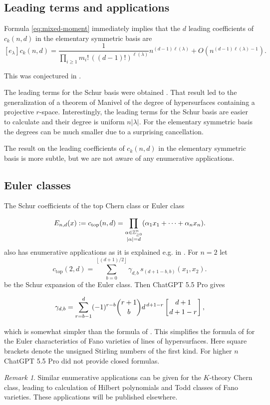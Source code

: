 \documentclass[11pt]{amsart}
\numberwithin{equation}{section}
\theoremstyle{remark}
\newtheorem{remark}[theorem]{Remark}
\newcommand{\Z}{\mathbb Z}
\begin{document}
\subsection{Leading terms and applications}
Formula \eqref{eq:mixed-moment} immediately implies that the $d$ leading coefficients of $c_k(n,d)$ in the elementary symmetric basis are
\[ [e_\lambda]{c_k(n,d)}
  =
  \frac{1}{\prod_{i\ge1}m_i!\,((d-1)!)^{\ell(\lambda)}}
  n^{(d-1)\ell(\lambda)}
  +O\left(n^{(d-1)\ell(\lambda)-1}\right).
\]

This was conjectured in \cite[Conj 3.10]{feher2025polynomiality}. 

The leading terms for the Schur basis were obtained \cite{feher2025polynomiality}. That result led to the generalization of a theorem of Manivel of the degree of hypersurfaces containing a projective  $r$-space. Interestingly, the leading terms for the Schur basis are easier to calculate and their degree is uniform $n|\lambda|$. For the elementary symmetric basis the degrees can be much smaller due to a surprising cancellation.

The result on the leading coefficients of $c_k(n,d)$ in the elementary symmetric basis is more subtle, but we are not aware of any enumerative applications.

\subsection{Euler classes}
The Schur coefficients of the top Chern class or Euler class 

\begin{equation}\label{eq:etop}
  E_{n,d}(x):=c_{\rm top}(n,d)=
  \prod_{\substack{\alpha\in\Z_{\ge0}^n\\|\alpha|=d}}
  (\alpha_1x_1+\cdots+\alpha_nx_n).
\end{equation}
also has enumerative applications as it is explained e.g. in \cite{feher2025polynomiality}.  For $n=2$ let 
\[
c_{\mathrm{top}}(2,d)
=
\sum_{b=0}^{\left\lfloor (d+1)/2\right\rfloor}
\gamma_{d,b}\,
s_{(d+1-b,b)}(x_1,x_2).
\]
be the Schur expansion of the Euler class. Then ChatGPT 5.5 Pro gives

\[
\gamma_{d,b}
=
\sum_{r=b-1}^{d}
(-1)^{r-b}
\binom{r+1}{b}
d^{\,d+1-r}
\left[{d+1\atop d+1-r}\right],
\]

which is somewhat simpler than the formula of \cite{feher2025polynomiality}. This simplifies the formula of \cite{feher2025polynomiality} for the Euler characteristics of Fano varieties of lines of hypersurfaces. Here square brackets denote the unsigned Stirling numbers of the first kind.
For higher $n$ ChatGPT 5.5 Pro did not provide closed formulas.
\bigskip
\begin{remark}
Similar enumerative applications can be given for the $K$-theory Chern class, leading to calculation of Hilbert polynomials and Todd classes of Fano varieties. These applications will be published elsewhere.
\end{remark}
\end{document}
